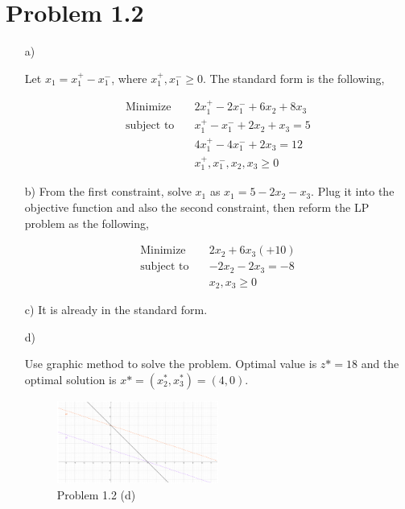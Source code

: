 \documentclass[12pt]{article}
\begin{document}
\section*{Problem 1.2}
\begin{enumerate}
\item[a)]

Let $x_1 = x_1^+ - x_1^-$, where $x_1^+, x_1^- \geqslant 0$. The standard form is the following,

\begin{equation*}
\begin{aligned}
\text{Minimize} \quad & 2x_1^+ - 2x_1^- + 6x_2 + 8x_3 \\
\text{subject\  to} \quad & x_1^+ - x_1^- + 2x_2 + x_3 = 5 \\
& 4x_1^+ - 4x_1^-  + 2x_3 = 12\\
& x_1^+, x_1^-, x_2, x_3 \geqslant 0
\end{aligned}
\end{equation*}

\item[b)]
From the first constraint, solve $x_1$ as $x_1 = 5 - 2x_2 - x_3$. Plug it into the objective function and also the second constraint, then reform the LP problem as the following,

\begin{equation*}
\begin{aligned}
\text{Minimize} \quad & 2x_2 + 6x_3 (+10)\\
\text{subject\  to} \quad & -2x_2 - 2x_3 = -8 \\
& x_2, x_3 \geqslant 0
\end{aligned}
\end{equation*}

\item[c)]
It is already in the standard form.

\item[d)]

Use graphic method to solve the problem. Optimal value is $z* = 18$ and the optimal solution is $x* = (x_2^*, x_3^*) = (4, 0)$.

\FloatBarrier

\begin{figure}[htpb]
  \caption{Problem 1.2 (d)}
  \centering
    \includegraphics[width=0.5\textwidth]{fig1.pdf}
\end{figure}

\FloatBarrier



\end{enumerate}
\end{document}
